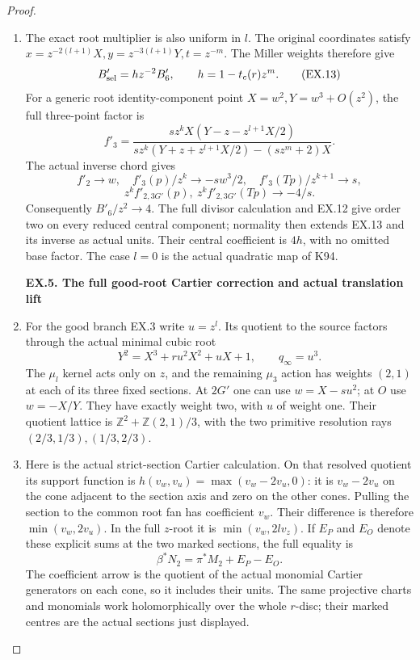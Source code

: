 \begin{proof}
\begin{enumerate}[label=\arabic*.]
\item The exact root multiplier is also uniform in \(l\). The original
coordinates satisfy \(x=z^{-2(l+1)}X,y=z^{-3(l+1)}Y,t=z^{-m}\).
The Miller weights therefore give
\[
 B_{\rm sel}'=h z^{-2}B'_6,\qquad h=1-t_c(r)z^m.
 \tag{EX.13}
\]
For a generic root identity-component point \(X=w^2,Y=w^3+O(z^2)\),
the full three-point factor is
\[
 f'_3=\frac{s z^k X(Y-z-z^{l+1}X/2)}
              {s z^k(Y+z+z^{l+1}X/2)-(s z^m+2)X}.
\]
The actual inverse chord gives
\[
 f'_2\to w,\quad f'_3(p)/z^k\to-s w^3/2,\quad
 f'_3(Tp)/z^{k+1}\to s,
\]
\[
 z^k f'_{2,3G'}(p),\ z^k f'_{2,3G'}(Tp)\to-4/s.
\]
Consequently \(B'_6/z^2\to4\). The full divisor calculation
and EX.12 give order two on every reduced central component;
normality then extends EX.13 and its inverse as actual units.
Their central coefficient is \(4h\), with no omitted base
factor. The case \(l=0\) is the actual quadratic map of K94.

\par

\medskip\noindent\textbf{EX.5. The full good-root Cartier correction and actual translation lift}

\par\nobreak

\item For the good branch EX.3 write \(u=z^l\). Its quotient to the
source factors through the actual minimal cubic root
\[
 Y^2=X^3+r u^2X^2+uX+1,\qquad q_\infty=u^3.
\]
The \(\mu_l\) kernel acts only on \(z\), and the remaining
\(\mu_3\) action has weights \((2,1)\) at each of its three
fixed sections. At \(2G'\) one can use
\(w=X-su^2\); at \(O\) use \(w=-X/Y\). They have exactly
weight two, with \(u\) of weight one. Their quotient lattice is
\(\mathbb Z^2+\mathbb Z(2,1)/3\), with the two primitive
resolution rays \((2/3,1/3),(1/3,2/3)\).

\item Here is the actual strict-section Cartier calculation. On that
resolved quotient its support function is
\(h(v_w,v_u)=\max(v_w-2v_u,0)\): it is \(v_w-2v_u\)
on the cone adjacent to the section axis and zero on the other
cones. Pulling the section to the common root fan has coefficient
\(v_w\). Their difference is therefore
\(\min(v_w,2v_u)\). In the full \(z\)-root it is
\(\min(v_w,2l v_z)\). If \(E_P\) and \(E_O\) denote
these explicit sums at the two marked sections, the full equality is
\[
          \beta^*N_2=\pi^*M_2+E_P-E_O.
 \tag{EX.14}
\]
The coefficient arrow is the quotient of the actual monomial
Cartier generators on each cone, so it includes their units.
The same projective charts and monomials work holomorphically
over the whole \(r\)-disc; their marked centres are the actual
sections just displayed.


\end{enumerate}
\end{proof}
